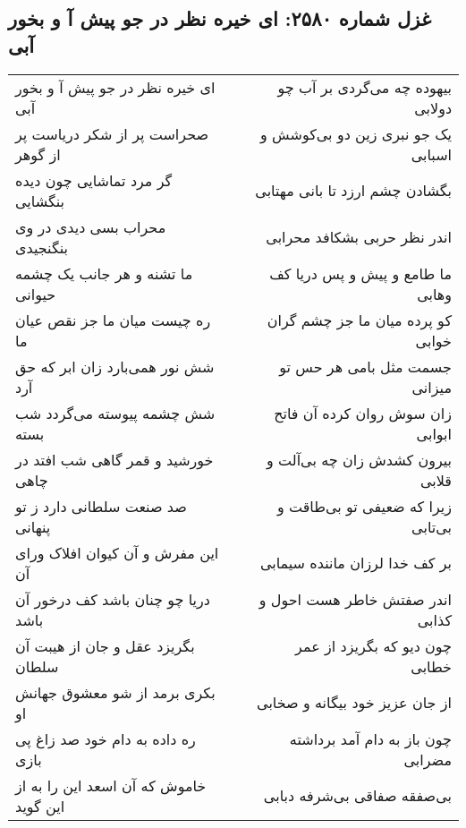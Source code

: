 \begin{center}
\section*{غزل شماره ۲۵۸۰: ای خیره نظر در جو پیش آ و بخور آبی}
\label{sec:2580}
\begin{longtable}{l p{0.5cm} r}
ای خیره نظر در جو پیش آ و بخور آبی
&&
بیهوده چه می‌گردی بر آب چو دولابی
\\
صحراست پر از شکر دریاست پر از گوهر
&&
یک جو نبری زین دو بی‌کوشش و اسبابی
\\
گر مرد تماشایی چون دیده بنگشایی
&&
بگشادن چشم ارزد تا بانی مهتابی
\\
محراب بسی دیدی در وی بنگنجیدی
&&
اندر نظر حربی بشکافد محرابی
\\
ما تشنه و هر جانب یک چشمه حیوانی
&&
ما طامع و پیش و پس دریا کف وهابی
\\
ره چیست میان ما جز نقص عیان ما
&&
کو پرده میان ما جز چشم گران خوابی
\\
شش نور همی‌بارد زان ابر که حق آرد
&&
جسمت مثل بامی هر حس تو میزانی
\\
شش چشمه پیوسته می‌گردد شب بسته
&&
زان سوش روان کرده آن فاتح ابوابی
\\
خورشید و قمر گاهی شب افتد در چاهی
&&
بیرون کشدش زان چه بی‌آلت و قلابی
\\
صد صنعت سلطانی دارد ز تو پنهانی
&&
زیرا که ضعیفی تو بی‌طاقت و بی‌تابی
\\
این مفرش و آن کیوان افلاک ورای آن
&&
بر کف خدا لرزان ماننده سیمابی
\\
دریا چو چنان باشد کف درخور آن باشد
&&
اندر صفتش خاطر هست احول و کذابی
\\
بگریزد عقل و جان از هیبت آن سلطان
&&
چون دیو که بگریزد از عمر خطابی
\\
بکری برمد از شو معشوق جهانش او
&&
از جان عزیز خود بیگانه و صخابی
\\
ره داده به دام خود صد زاغ پی بازی
&&
چون باز به دام آمد برداشته مضرابی
\\
خاموش که آن اسعد این را به از این گوید
&&
بی‌صفقه صفاقی بی‌شرفه دبابی
\\
\end{longtable}
\end{center}
